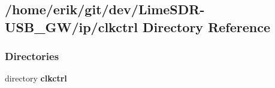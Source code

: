 \subsection{/home/erik/git/dev/\+Lime\+S\+D\+R-\/\+U\+S\+B\+\_\+\+G\+W/ip/clkctrl Directory Reference}
\label{dir_11f07d1eedd6d7259c0537e239e0be8b}
\subsubsection*{Directories}
\begin{DoxyCompactItemize}
\item 
directory {\bf clkctrl}
\end{DoxyCompactItemize}
